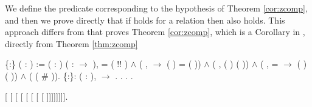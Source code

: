     We define the predicate  corresponding to the
    hypothesis of Theorem \ref{cor:zcomp}, and then we prove
    directly that if  holds for a relation  then 
     also holds. This approach differs from
    \cite{Nakazawa-Fujita2016} that proves Theorem
    \ref{cor:zcomp}, which is a Corollary in \cite{Nakazawa-Fujita2016}, 
    directly from Theorem \ref{thm:zcomp} \begin{coqdoccode}
\coqdocemptyline
\coqdocnoindent
{}  \{:\} ( : ) := \coqdoctac{\ensuremath{\exists}} ( :  ) ( :  \ensuremath{\rightarrow} ),  = ( !\coqdocvar{\_}! ) \ensuremath{\land} (\coqdockw{\ensuremath{\forall}}  ,    \ensuremath{\rightarrow} ( ) = ( )) \ensuremath{\land} (\coqdockw{\ensuremath{\forall}} , ( )  ( )) \ensuremath{\land} (\coqdockw{\ensuremath{\forall}}  ,  =   \ensuremath{\rightarrow} ( )  ( )) \ensuremath{\land} (   ( \# )).\coqdoceol
\coqdocemptyline
\coqdocnoindent
{}  \{:\}: \coqdockw{\ensuremath{\forall}} ( :  ),   \ensuremath{\rightarrow}  .\coqdoceol
\coqdocnoindent
{}.\coqdoceol
\coqdocindent{1.00em}
  .    . \end{coqdoccode}
 \begin{coqdoccode}
\coqdocemptyline
\coqdocindent{1.00em}
   [ [ [ [ [ [ [ [ ]]]]]]]]. \end{coqdoccode}
